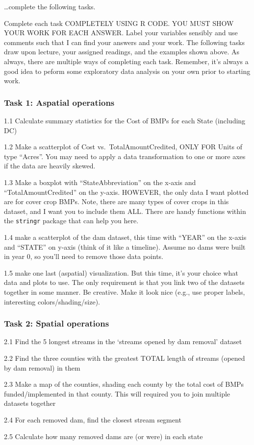\documentclass[]{article}
\begin{document}
\ldots complete the following tasks.

Complete each task COMPLETELY USING R CODE. YOU MUST SHOW YOUR WORK FOR
EACH ANSWER. Label your variables sensibly and use comments such that I
can find your answers and your work. The following tasks draw upon
lecture, your assigned readings, and the examples shown above. As
always, there are multiple ways of completing each task. Remember, it's
always a good idea to peform some exploratory data analysis on your own
prior to starting work.

\hypertarget{task-1-aspatial-operations}{%
\subsubsection{Task 1: Aspatial
operations}\label{task-1-aspatial-operations}}

1.1 Calculate summary statistics for the Cost of BMPs for each State
(including DC)

1.2 Make a scatterplot of Cost vs.~TotalAmountCredited, ONLY FOR Units
of type ``Acres''. You may need to apply a data transformation to one or
more axes if the data are heavily skewed.

1.3 Make a boxplot with ``StateAbbreviation'' on the x-axis and
``TotalAmountCredited'' on the y-axis. HOWEVER, the only data I want
plotted are for cover crop BMPs. Note, there are many types of cover
crops in this dataset, and I want you to include them ALL. There are
handy functions within the \texttt{stringr} package that can help you
here.

1.4 make a scatterplot of the dam dataset, this time with ``YEAR'' on
the x-axis and ``STATE'' on y-axis (think of it like a timeline). Assume
no dams were built in year 0, so you'll need to remove those data
points.

1.5 make one last (aspatial) visualization. But this time, it's your
choice what data and plots to use. The only requirement is that you link
two of the datasets together in some manner. Be creative. Make it look
nice (e.g., use proper labels, interesting colors/shading/size).

\hypertarget{task-2-spatial-operations}{%
\subsubsection{Task 2: Spatial
operations}\label{task-2-spatial-operations}}

2.1 Find the 5 longest streams in the `streams opened by dam removal'
dataset

2.2 Find the three counties with the greatest TOTAL length of streams
(opened by dam removal) in them

2.3 Make a map of the counties, shading each county by the total cost of
BMPs funded/implemented in that county. This will required you to join
multiple datasets together

2.4 For each removed dam, find the closest stream segment

2.5 Calculate how many removed dams are (or were) in each state
\end{document}
